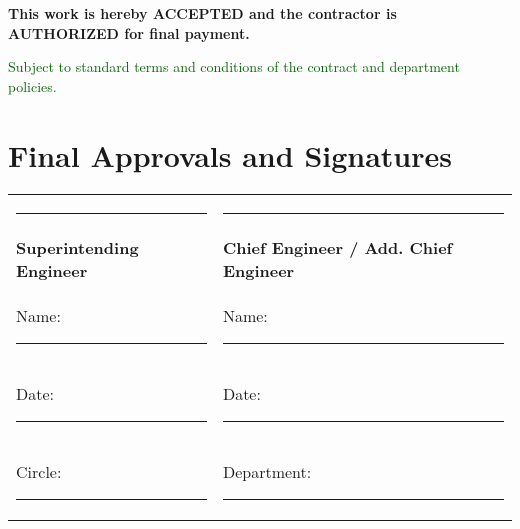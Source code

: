 \documentclass[12pt,a4paper]{article}
\begin{document}
\begin{center}
{\begin{minipage}{0.95\textwidth}
\begin{center}
{\begin{minipage}{0.8\textwidth}
\begin{center}
\vspace{0.5cm}
\textbf{\large This work is hereby ACCEPTED and the contractor is AUTHORIZED for final payment.}

\vspace{0.3cm}
\textcolor{darkgreen}{Subject to standard terms and conditions of the contract and department policies.}
\end{center}
\end{minipage}}
\end{center}

\vspace{1cm}
\end{minipage}}
\end{center}

\vspace{1.5cm}
\section*{Final Approvals and Signatures}

\begin{center}
\begin{tabular}{p{7cm}p{7cm}}
\rule{6cm}{0.5pt} & \rule{6cm}{0.5pt} \\
\textbf{Superintending Engineer} & \textbf{Chief Engineer / Add. Chief Engineer} \\
Name: \rule{5cm}{0.5pt} & Name: \rule{5cm}{0.5pt} \\
Date: \rule{5cm}{0.5pt} & Date: \rule{5cm}{0.5pt} \\
Circle: \rule{5cm}{0.5pt} & Department: \rule{4cm}{0.5pt} \\
\end{tabular}
\end{center}

\vspace{2cm}
\begin{center}
\end{center}
\end{document}

